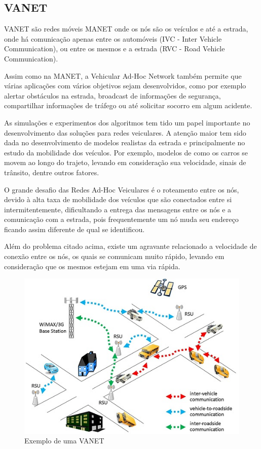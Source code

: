 \documentclass[12pt, %
openright, 
oneside,
a4paper,
brazil]{facom-ufu-abntex2}
\begin{document}
\subsection{VANET}
\ac{VANET} são redes móveis \ac{MANET} onde os nós são os veículos e até a estrada, onde há comunicação apenas entre os automóveis (IVC - Inter Vehicle Communication), ou entre os mesmos e a estrada (RVC - Road Vehicle Communication). \cite{ufrj-Vanet}

Assim como na MANET, a Vehicular Ad-Hoc Network também permite que várias aplicações com vários objetivos sejam desenvolvidos, como por exemplo alertar obstáculos na estrada, broadcast de informações de segurança, compartilhar informações de tráfego ou até solicitar socorro em algum acidente.

As simulações e experimentos dos algoritmos tem tido um papel importante no desenvolvimento das soluções para redes veiculares. A atenção maior tem sido dada no desenvolvimento de modelos realistas da estrada e principalmente no estudo da mobilidade dos veículos. Por exemplo, modelos de como os carros se movem ao longo do trajeto, levando em consideração sua velocidade, sinais de trânsito, dentre outros fatores. \cite{6710069} 

O grande desafio das Redes Ad-Hoc Veiculares é o roteamento entre os nós, devido à alta taxa de mobilidade dos veículos que são conectados entre si intermitentemente, dificultando a entrega das mensagens entre os nós e a comunicação com a estrada, pois frequentemente um nó muda seu endereço ficando assim diferente de qual se identificou.

Além do problema citado acima, existe um agravante relacionado a velocidade de conexão entre os nós, os quais se comunicam muito rápido, levando em consideração que os mesmos estejam em uma via rápida.
\begin{center}
\begin{figure}[hbt]
  \includegraphics[scale=1.0]{vanet}
  \caption{Exemplo de uma \ac{VANET}}
\end{figure}
\end{center}
\end{document}
